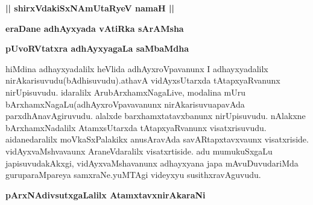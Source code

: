 \begin{center}
{\large\bf || shirxVdakiSxNAmUtaRyeV namaH ||}
\bigskip

{\Large\bf eraDane adhAyxyada vAtiRka sArAMsha}
\end{center}


\begin{artha}
{\bf pUvoRVtatxra adhAyxyagaLa saMbaMdha}
\end{artha}


\begin{artha}
hiMdina adhayxyadalilx heVlida adhAyxroVpavanunx I adhayxyadalilx nirAkarisuvudu(bAdhisuvudu).athavA vidAyxsUtarxda tAtapxyaRvanunx nirUpisuvudu. idaralilx ArubArxhamxNagaLive, modalina mUru bArxhamxNagaLu(adhAyxroVpavavanunx nirAkarisuvuapavAda parxdhAnavAgiruvudu. alalxde barxhamxtatavxbanunx nirUpisuvudu. nAlakxne bArxhamxNadalilx AtamxsUtarxda tAtapxyaRvanunx visatxrisuvudu. aidanedaralilx moVkaSxPalakikx anusAravAda savARtapxtavxvaunx visatxriside. vidAyxvaMshvavaunx AraneVdaralilx visatxrtiside. adu mumukuSxgaLu japisuvudakAkxgi, vidAyxvaMshavanunx adhayxyana japa mAvuDuvudariMda guruparaMpareya samxraNe.yuMTAgi videyxyu susithxravAguvudu.
\end{artha}

\begin{center}
\begin{artha}
{\bf pArxNAdivsutxgaLalilx AtamxtavxnirAkaraNi }
\end{artha}
\end{center}

